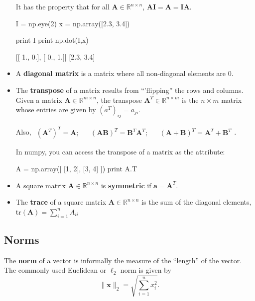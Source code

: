 \begin{itemize}
It has the property that for all $\textbf{A} \in \mathbb{R}^{n \times n}$, $\textbf{AI} = \textbf{A} = \textbf{IA}.$

\begin{python}
I = np.eye(2)
x = np.array([2.3, 3.4])

print I
print np.dot(I,x)

[[ 1.,  0.],
 [ 0.,  1.]]
[2.3, 3.4]
\end{python}

\item A {\bf diagonal matrix} is a matrix where all non-diagonal elements are $0$.


\item The {\bf transpose} of a matrix results from ``'flipping'' the rows and columns. 
Given a matrix $\textbf{A} \in \mathbb{R}^{m\times n}$, the transpose $\textbf{A}^{T} \in \mathbb{R}^{n\times m}$
is the $n \times m$ matrix whose entries are given by 
$(a^{T})_{ij}= a_{ji}$.

Also, $\begin{array}{ccccc}(\textbf{A}^{T})^{T}= \textbf{A}; &  & (\textbf{AB})^{T}=\textbf{B}^{T}\textbf{A}^{T}; & & (\textbf{A}+\textbf{B})^{T}= \textbf{A}^{T}+\textbf{B}^{T} \end{array}$.

In numpy, you can access the transpose of a matrix as the  attribute:

\begin{python}
A = np.array([ [1, 2], [3, 4] ])
print A.T
\end{python}

\item A square matrix $\textbf{A} \in \mathbb{R}^{n\times n}$ is {\bf symmetric} if $\textbf{a}=\textbf{A}^{T}$. %

\item The {\bf trace} of a square matrix $\textbf{A} \in \mathbb{R}^{n\times n}$ is the sum of the diagonal
elements, tr$(\textbf{A})= \sum\limits_{i=1}^{n} A_{ii}$

\end{itemize}
\subsection{Norms}
The {\bf norm} of a vector is informally the measure of the ``length'' of the vector. The commonly used Euclidean or $\ell_{2}$ norm is given by
\begin{equation*}
\|\textbf{x}\|_{2}=\sqrt{\sum\limits_{i=1}^{n} x_{i}^{2}}.
\end{equation*}

